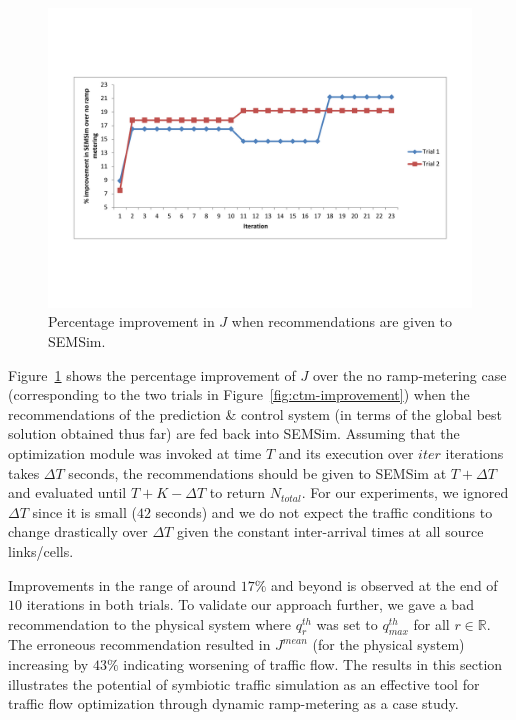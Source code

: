 \documentclass[12pt]{article}
\begin{document}
  
  \begin{figure}[!htbp]
      \centering
      \includegraphics[clip=false,scale=0.52]{images/SEMSim-improvement-PSO.pdf}
              \caption{Percentage improvement in $J$ when recommendations are given to SEMSim.}
      \label{fig:semsim-improvement}
    \end{figure}

 Figure~\ref{fig:semsim-improvement} shows the percentage improvement of $J$ over the no ramp-metering case (corresponding to the two trials in Figure~\ref{fig:ctm-improvement}) when the recommendations of the prediction \& control system (in terms of the global best solution obtained thus far) are fed back into SEMSim. Assuming that the optimization module was invoked at time $T$ and its execution over $iter$ iterations takes $\Delta T$ seconds, the recommendations should be given to SEMSim at $T+\Delta T$ and evaluated until $T+K-\Delta T$ to return $N_{total}$. For our experiments, we ignored $\Delta T$ since it is small ($42$ seconds) and we do not expect the traffic conditions to change drastically over $\Delta T$ given the constant inter-arrival times at all source links/cells.  
 
Improvements in the  range of around $17\%$ and beyond is observed at the end of $10$ iterations in both trials. To validate our approach further, we gave a bad recommendation to the physical system where $q^{th}_r$ was set to $q^{th}_{max}$ for all $r\in \mathbb{R}$. The erroneous recommendation resulted in $J^{mean}$ (for the physical system) increasing by $43\%$ indicating worsening of traffic flow. The results in this section  illustrates the potential of symbiotic traffic simulation as an effective tool for traffic flow optimization through dynamic ramp-metering as a case study.
\end{document}
